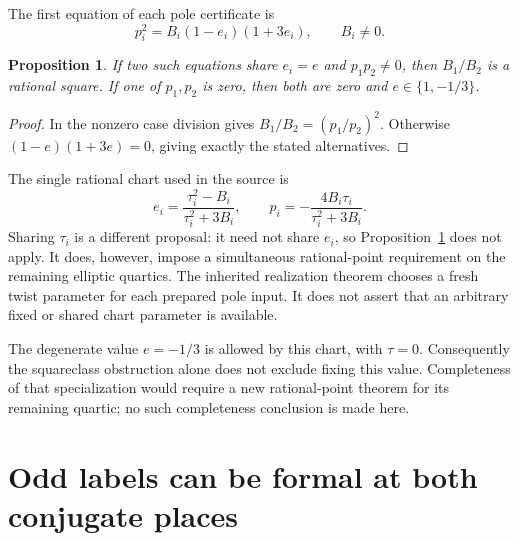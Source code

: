 \documentclass[11pt,a4paper]{article}
\newtheorem{proposition}[theorem]{Proposition}
\theoremstyle{remark}\newtheorem{remark}[theorem]{Remark}
\begin{document}
The first equation of each pole certificate is
\[
                  p_i^2=B_i(1-e_i)(1+3e_i),\qquad B_i\ne0.
\]

\begin{proposition}\label{prop:shared-e}
If two such equations share $e_i=e$ and $p_1p_2\ne0$, then
$B_1/B_2$ is a rational square.  If one of $p_1,p_2$ is zero,
then both are zero and $e\in\{1,-1/3\}$.
\end{proposition}
\begin{proof}
In the nonzero case division gives $B_1/B_2=(p_1/p_2)^2$.
Otherwise $(1-e)(1+3e)=0$, giving exactly the stated alternatives.
\end{proof}

The single rational chart used in the source is
\[
 e_i=\frac{\tau_i^2-B_i}{\tau_i^2+3B_i},\qquad
 p_i=-\frac{4B_i\tau_i}{\tau_i^2+3B_i}.
\]
Sharing $\tau_i$ is a different proposal: it need not share $e_i$,
so Proposition~\ref{prop:shared-e} does not apply.  It does,
however, impose a simultaneous rational-point requirement on
the remaining elliptic quartics.  The inherited realization
theorem chooses a fresh twist parameter for each prepared pole
input.  It does not assert that an arbitrary fixed or shared
chart parameter is available.

The degenerate value $e=-1/3$ is allowed by this chart, with
$\tau=0$.  Consequently the squareclass obstruction alone does
not exclude fixing this value.  Completeness of that specialization
would require a new rational-point theorem for its remaining
quartic; no such completeness conclusion is made here.

\section{Odd labels can be formal at both conjugate places}
\end{document}
